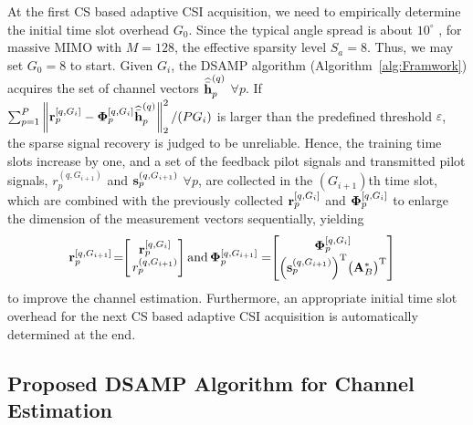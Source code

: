 \documentclass[final]{IEEEtran}
\begin{document}
 At the first CS based adaptive CSI acquisition, we need to empirically determine the
 initial time slot overhead $G_0$. Since the typical angle spread is about $10^{\circ}$
 \cite{Haifan}, for massive MIMO with $M=128$, the effective sparsity level $S_a = 8$.
 Thus, we may set $G_0=8$ to start. Given $G_i$, the DSAMP algorithm (Algorithm~\ref{alg:Framwork})
 acquires the set of channel vectors $\widehat{\bar{\bf h}}_p^{(q)}$ $\forall p$.
 If $\sum\nolimits_{p=1}^{P}\left\|
 {\bf r}_p^{[q,G_{i}]}-{\bf \Phi}_p^{[q,G_{i}]}{\widehat{\bar{\bf h}}_p}^{(q)} \right\|_2^2/(PG_i)$
 is larger than the predefined threshold $\varepsilon$, the sparse signal recovery is judged
 to be unreliable. Hence, the training time slots increase by one, and a set of the feedback
 pilot signals and transmitted pilot signals, $r_p^{(q,G_{i+1})}$ and ${\bf s}_p^{(q,G_{i+1})}$
 $\forall p$, are collected in the $(G_{i+1})$th time slot, which are combined with the
 previously collected ${\bf r}_p^{[q,G_i]}$ and ${\bf \Phi}_p^{[q,G_i]}$ to enlarge the
 dimension of the measurement vectors sequentially, yielding
\begin{align*}
 & {\bf r}_p^{[q,G_{i+1}]} \!= \!\! \left[ \!\! \begin{array}{c} {\bf r}_p^{[q,G_i]} \\ r_p^{(q,G_{i+1})}
 \end{array} \!\!\! \right] \! \! \mbox{ and }\!
 {\bf \Phi}_p^{[q,G_{i+1}]} = \!\! \left[ \!\!\! \begin{array}{c} {\bf \Phi}_p^{[q,G_i]} \\
 \Big( {\bf s}_p^{(q,G_{i+1})} \Big)^{\rm T} \big( {\bf A}_B^{*} \big)^{\rm T} \end{array} \!\!\! \right] \!
\end{align*}
 to improve the channel estimation. Furthermore, an appropriate initial time slot overhead
 for the next CS based adaptive CSI acquisition is automatically determined at the end.

\subsection{Proposed DSAMP Algorithm for Channel Estimation}\label{DSAMP}
\end{document}
